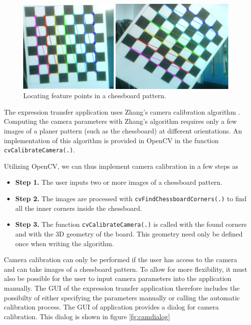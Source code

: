 \documentclass[11pt,a4paper]{report}
\begin{document}
\begin{figure}[H]
\begin{centering}
\includegraphics[scale=0.48]{images/chessboard_pattern.png}
\par\end{centering}

\caption{Locating feature points in a chessboard pattern.}
\label{fg:chessboard}

\end{figure}

The expression transfer application uses Zhang's camera calibration algorithm
\cite{zhang}. Computing the camera parameters with Zhang's algorithm requires
only a few images of a planer pattern (such as the chessboard) at different
orientations. An implementation of this algorithm is provided in OpenCV in the
function \texttt{cvCalibrateCamera(.)}. 

Utilizing OpenCV, we can thus implement camera calibration in a few steps as
\begin{itemize}
\item \textbf{Step 1.} The user inputs two or more images of a chessboard
  pattern.
\item \textbf{Step 2.} The images are processed with
  \texttt{cvFindChessboardCorners(.)} to find all the inner corners inside the
  chessboard.
\item \textbf{Step 3.} The function \texttt{cvCalibrateCamera(.)} is called with
  the found corners and with the 3D geometry of the board. This geometry need
  only be defined once when writing the algorithm.
\end{itemize}


Camera calibration can only be performed if the
user has access to the camera and can take images of a chessboard pattern. To
allow for more flexibility, it must also be possible for the user to
input camera parameters into the application manually. The GUI of the expression
transfer application therefore includes the possibilty of either specifying the
parameters manually or calling the automatic calibration process. The GUI of
application provides a dialog for camera calibration. This dialog is shown in
figure \ref{fg:camdialog}
\end{document}
